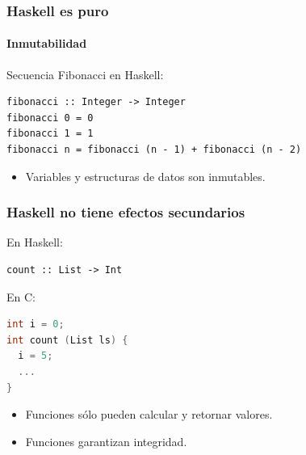 \documentclass{beamer}
\begin{document}

\begin{frame}[fragile]
  \frametitle{Haskell es puro}
  \framesubtitle{Inmutabilidad}

Secuencia Fibonacci en Haskell: 

\begin{lstlisting}
fibonacci :: Integer -> Integer
fibonacci 0 = 0
fibonacci 1 = 1
fibonacci n = fibonacci (n - 1) + fibonacci (n - 2)
\end{lstlisting}

\vspace{0.3cm}

\begin{itemize}
\item Variables y estructuras de datos son inmutables.
\end{itemize}

\end{frame}


\begin{frame}[fragile]
  \frametitle{Haskell no tiene efectos secundarios}

En Haskell: 

\begin{lstlisting}
count :: List -> Int
\end{lstlisting}

\vspace{0.3cm}

En C:

\begin{lstlisting}[language=c]
int i = 0;
int count (List ls) {
  i = 5;
  ...
}
\end{lstlisting}

\vspace{0.3cm}

\begin{itemize}
\item Funciones sólo pueden calcular y retornar valores. 
\item Funciones garantizan integridad.
\end{itemize}

\end{frame}

\end{document}
